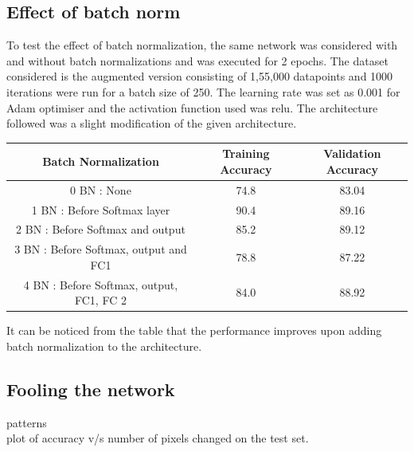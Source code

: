 \documentclass[12pt]{report}
\begin{document}
\subsection {Effect of batch norm}
To test the effect of batch normalization, the same network was considered with and without batch normalizations and was executed for 2 epochs. The dataset considered is the augmented version consisting of 1,55,000 datapoints and 1000 iterations were run for a batch size of 250. The learning rate was set as 0.001 for Adam optimiser and the activation function used was relu. The architecture followed was a slight modification of the given architecture.
\begin{table}[H]
	\label{T:equipos}
	\begin{center}
		\begin{tabular}{| c | c | c |}
			\hline
			\textbf{Batch Normalization} & \textbf{Training Accuracy} & \textbf{Validation Accuracy}\\
            \hline
            0 BN : None & 74.8 & 83.04 \\
            1 BN : Before Softmax layer & 90.4 & 89.16 \\
            2 BN : Before Softmax and output & 85.2 & 89.12 \\
            3 BN : Before Softmax, output and FC1 & 78.8 & 87.22 \\
            4 BN : Before Softmax, output, FC1, FC 2 & 84.0 & 88.92 \\
            \hline
		\end{tabular}
	\end{center}
\end{table}
It can be noticed from the table that the performance improves upon adding batch normalization to the architecture.

\subsection{Fooling the network}
 patterns\\
 plot of accuracy v/s number of pixels changed on the test set.
 
\end{document}

